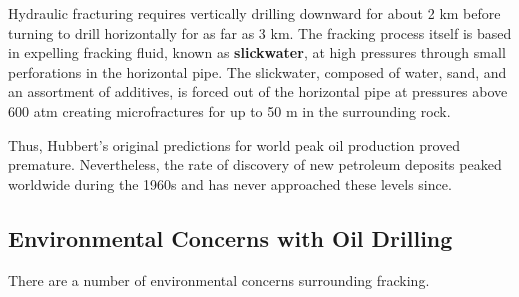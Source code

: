 Hydraulic fracturing requires vertically drilling downward for about 2 km before turning to drill horizontally for as far as 3 km.  The fracking process itself is based in expelling fracking fluid, known as \textbf{slickwater}, at high pressures through small perforations in the horizontal pipe. The slickwater, composed of water, sand, and an assortment of additives, is forced out of the horizontal pipe at pressures above 600 atm creating microfractures for up to 50 m in the surrounding rock.

Thus, Hubbert's original predictions for world peak oil production proved premature. Nevertheless, the rate of discovery of new petroleum deposits peaked worldwide during the 1960s and has never approached these levels since.

\subsection{Environmental Concerns with Oil Drilling}

There are a number of environmental concerns surrounding fracking. 


